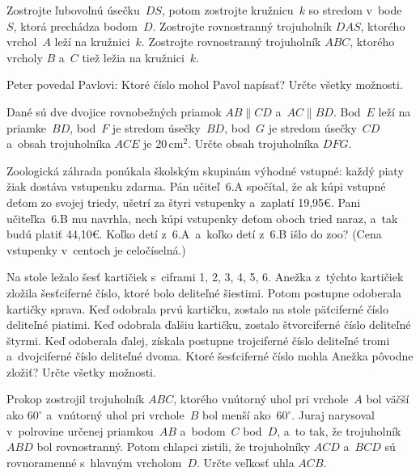 {%
Zostrojte ľubovoľnú úsečku~$DS$, potom zostrojte kružnicu~$k$ so stredom v~bode~$S$, ktorá prechádza bodom~$D$.
 Zostrojte rovnostranný trojuholník $DAS$, ktorého vrchol~$A$ leží
na kružnici~$k$.
 Zostrojte rovnostranný trojuholník $ABC$, ktorého vrcholy $B$ a~$C$ tiež ležia na kružnici~$k$.
\endgraf
}

{%
Peter povedal Pavlovi:
Ktoré číslo mohol Pavol napísať? Určte všetky možnosti.
}

{%
Dané sú dve dvojice rovnobežných priamok $AB\parallel CD$ a~${AC\parallel BD}$.
Bod~$E$ leží na priamke~$BD$, bod~$F$ je stredom úsečky~$BD$, bod~$G$ je stredom úseč\-ky~$CD$ a~obsah trojuholníka $ACE$ je 20\,cm$^2$.
Určte obsah trojuholníka $DFG$.}

{%
Zoologická záhrada ponúkala školským skupinám výhodné vstupné: každý piaty žiak dostáva vstupenku zdarma.
Pán učiteľ~6.A spočítal, že ak kúpi vstupné deťom zo svojej triedy, ušetrí za štyri vstupenky a~zaplatí 19{,}95€.
Pani učiteľka~6.B mu navrhla, nech kúpi vstupenky deťom oboch tried naraz, a~tak budú platiť 44{,}10€.
Koľko detí z~6.A~a~koľko detí z~6.B išlo do zoo? (Cena vstupenky v~centoch je celočíselná.)
}

{%
Na stole ležalo šesť kartičiek s~ciframi 1, 2, 3, 4, 5, 6.
Anežka z~týchto kartičiek zložila šesťciferné číslo, ktoré bolo deliteľné šiestimi.
Potom postupne odoberala kartičky sprava.
Keď odobrala prvú kartičku, zostalo na stole päťciferné číslo deliteľné piatimi.
Keď odobrala ďalšiu kartičku, zostalo štvorciferné číslo deliteľné štyrmi.
Keď odoberala ďalej, získala postupne trojciferné číslo deliteľné tromi a~dvojciferné číslo deliteľné dvoma.
Ktoré šesťciferné číslo mohla Anežka pôvodne zložiť?
Určte všetky možnosti.
}

{%
Prokop zostrojil trojuholník $ABC$, ktorého vnútorný uhol pri vrchole~$A$ bol väčší ako $60^\circ$ a~vnútorný uhol pri vrchole~$B$ bol menší ako~$60^\circ$. Juraj narysoval v~polrovine určenej priamkou~$AB$ a~bodom~$C$ bod~$D$, a~to tak, že trojuholník $ABD$ bol rovnostranný.
Potom chlapci zistili, že trojuholníky $ACD$ a~$BCD$ sú rovnoramenné s~hlavným vrcholom~$D$.
Určte veľkosť uhla $ACB$.}

